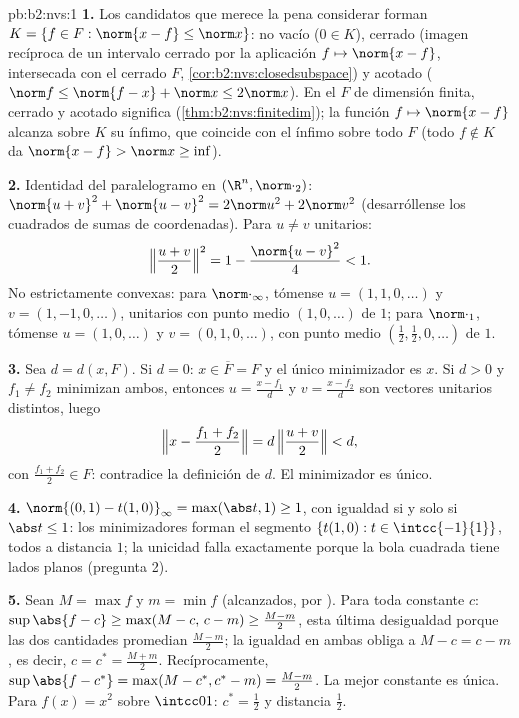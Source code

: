\begin{solution}{pb:b2:nvs:1}
\textbf{1.} Los candidatos que merece la pena considerar forman $K
= \{f \in F : \norm{x - f} \leq \norm x\}$: no vacío ($0 \in K$),
cerrado (imagen recíproca de un intervalo cerrado por la aplicación
 $f \mapsto \norm{x - f}$, intersecada con el cerrado $F$,
\cref{cor:b2:nvs:closedsubspace}) y acotado ($\norm f \leq \norm{f
- x} + \norm x \leq 2\norm x$). En el $F$ de dimensión finita,
cerrado y acotado significa 
(\cref{thm:b2:nvs:finitedim}); la función  $f \mapsto
\norm{x - f}$ alcanza sobre $K$ su ínfimo, que coincide con el
ínfimo sobre todo $F$ (todo $f \notin K$ da $\norm{x - f} > \norm
x \geq \inf$).

\textbf{2.} Identidad del paralelogramo en $(\R^n,
\norm\cdot_2)$: $\norm{u + v}^2 + \norm{u - v}^2 = 2\norm u^2 +
2\norm v^2$ (desarróllense los cuadrados de sumas de coordenadas).
Para $u \neq v$ unitarios:
\[
\Bigl\Vert\frac{u+v}2\Bigr\Vert^2 = 1 - \frac{\norm{u -
v}^2}{4} < 1 .
\]
No estrictamente convexas: para $\norm\cdot_\infty$, tómense $u =
(1, 1, 0, \dots)$ y $v = (1, -1, 0, \dots)$, unitarios con punto
medio $(1, 0, \dots)$ de  $1$; para $\norm\cdot_1$, tómense
$u = (1, 0, \dots)$ y $v = (0, 1, 0, \dots)$, con punto medio
$(\frac12, \frac12, 0, \dots)$ de  $1$.

\textbf{3.} Sea $d = d(x, F)$. Si $d = 0$: $x \in \overline F = F$
y el único minimizador es $x$. Si $d > 0$ y $f_1 \neq f_2$
minimizan ambos, entonces $u = \frac{x - f_1}{d}$ y $v = \frac{x -
f_2}{d}$ son vectores unitarios distintos, luego
\[
\Bigl\Vert x - \frac{f_1 + f_2}2\Bigr\Vert
= d\,\Bigl\Vert\frac{u + v}2\Bigr\Vert < d ,
\]
con $\frac{f_1 + f_2}2 \in F$: contradice la definición de $d$. El
minimizador es único.

\textbf{4.} $\norm{(0,1) - t(1,0)}_\infty = \max(\abs t, 1) \geq
1$, con igualdad si y solo si $\abs t \leq 1$: los minimizadores
forman el segmento $\{t(1, 0) : t \in \intcc{-1}{1}\}$, todos a
distancia $1$; la unicidad falla exactamente porque la bola
cuadrada tiene lados planos (pregunta 2).

\textbf{5.} Sean $M = \max f$ y $m = \min f$ (alcanzados, por
). Para toda constante $c$: $\sup\abs{f - c} \geq
\max(M - c,\, c - m) \geq \frac{M - m}2$, esta última desigualdad
porque las dos cantidades promedian $\frac{M-m}2$; la igualdad en
ambas obliga a $M - c = c - m$, es decir, $c = c^* = \frac{M +
m}2$. Recíprocamente, $\sup\abs{f - c^*} = \max(M - c^*, c^* - m)
= \frac{M - m}2$. La mejor constante es única. Para $f(x) = x^2$
sobre $\intcc01$: $c^* = \frac12$ y distancia $\frac12$.


\end{solution}
